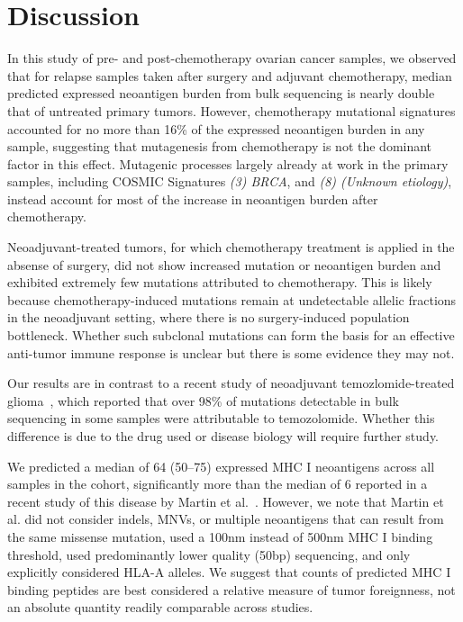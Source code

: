 \section*{Discussion}
In this study of pre- and post-chemotherapy ovarian cancer samples, we observed that for relapse samples taken after surgery and adjuvant chemotherapy, median predicted expressed neoantigen burden from bulk sequencing is nearly double that of untreated primary tumors. However, chemotherapy mutational signatures accounted for no more than 16\% of the expressed neoantigen burden in any sample, suggesting that mutagenesis from chemotherapy is not the dominant factor in this effect. Mutagenic processes largely already at work in the primary samples, including COSMIC Signatures \textit{(3) BRCA}, and \textit{(8) (Unknown etiology)}, instead account for most of the increase in neoantigen burden after chemotherapy. 

Neoadjuvant-treated tumors, for which chemotherapy treatment is applied in the absense of surgery, did not show increased mutation or neoantigen burden and exhibited extremely few mutations attributed to chemotherapy. This is likely because chemotherapy-induced mutations remain at undetectable allelic fractions in the neoadjuvant setting, where there is no surgery-induced population bottleneck. Whether such subclonal mutations can form the basis for an effective anti-tumor immune response is unclear but there is some evidence they may not\cite{McGranahan_2016}.

Our results are in contrast to a recent study of neoadjuvant temozlomide-treated glioma~\cite{Johnson_2013}, which reported that over 98\% of mutations detectable in bulk sequencing in some samples were attributable to temozolomide. Whether this difference is due to the drug used or disease biology will require further study.

We predicted a median of 64 (50--75) expressed MHC I neoantigens across all samples in the cohort, significantly more than the median of 6 reported in a recent study of this disease by Martin et al.~\cite{Martin_2016}. However, we note that Martin et al. did not consider indels, MNVs, or multiple neoantigens that can result from the same missense mutation, used a 100nm instead of 500nm MHC I binding threshold, used predominantly lower quality (50bp) sequencing, and only explicitly considered HLA-A alleles. We suggest that counts of predicted MHC I binding peptides are best considered a relative measure of tumor foreignness, not an absolute quantity readily comparable across studies.


